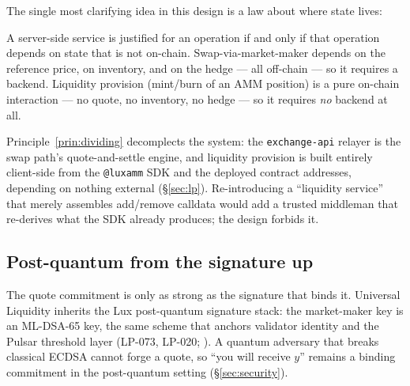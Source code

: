 The single most clarifying idea in this design is a law about where
state lives:

\begin{principle}
\label{prin:dividing}
A server-side service is justified for an operation if and only if that
operation depends on state that is not on-chain. Swap-via-market-maker
depends on the reference price, on inventory, and on the hedge --- all
off-chain --- so it requires a backend. Liquidity provision
(mint/burn of an AMM position) is a pure on-chain interaction --- no
quote, no inventory, no hedge --- so it requires \emph{no} backend at
all.
\end{principle}

Principle~\ref{prin:dividing} decomplects the system: the
\texttt{exchange-api} relayer is the swap path's quote-and-settle
engine, and liquidity provision is built entirely client-side from the
\texttt{@luxamm} SDK and the deployed contract addresses, depending on
nothing external (\S\ref{sec:lp}). Re-introducing a ``liquidity
service'' that merely assembles add/remove calldata would add a trusted
middleman that re-derives what the SDK already produces; the design
forbids it.

\subsection{Post-quantum from the signature up}

The quote commitment is only as strong as the signature that binds it.
Universal Liquidity inherits the Lux post-quantum signature stack: the
market-maker key is an ML-DSA-65 key, the same scheme that anchors
validator identity and the Pulsar threshold layer (LP-073, LP-020;
\cite{lp073,lp020}). A quantum adversary that breaks classical ECDSA
cannot forge a quote, so ``you will receive $y$'' remains a binding
commitment in the post-quantum setting (\S\ref{sec:security}).
